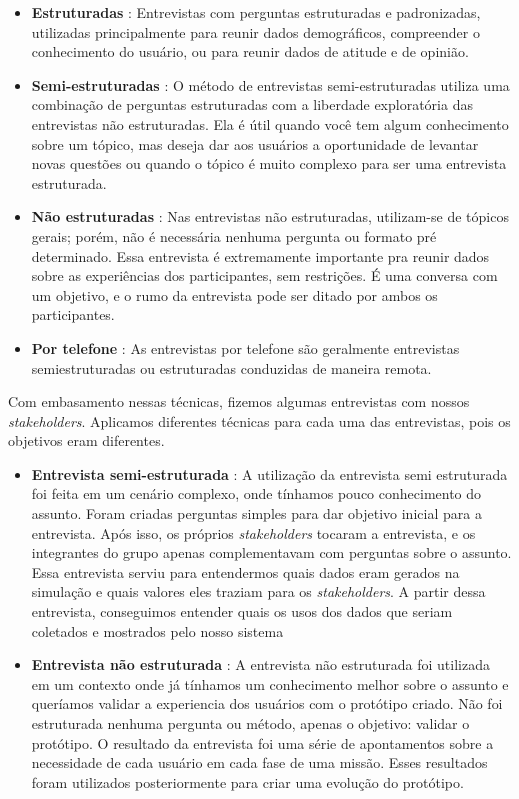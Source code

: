 \begin{itemize}
\item \textbf{Estruturadas} : Entrevistas com perguntas estruturadas e padronizadas, utilizadas principalmente para reunir dados demográficos, compreender o conhecimento do usuário, ou para reunir dados de atitude e de opinião.
\item \textbf{Semi-estruturadas} : O método de entrevistas semi-estruturadas utiliza uma combinação de perguntas estruturadas com a liberdade exploratória das entrevistas não estruturadas.
Ela é útil quando você tem algum conhecimento sobre um tópico, mas deseja dar aos usuários a oportunidade de levantar novas questões ou quando o tópico é muito complexo para ser uma entrevista estruturada.
\item \textbf{Não estruturadas} : Nas entrevistas não estruturadas, utilizam-se de tópicos gerais; porém, não é necessária nenhuma pergunta ou formato pré determinado. Essa entrevista é extremamente importante pra reunir dados sobre as experiências dos participantes, sem restrições. É uma conversa com um objetivo, e o rumo da entrevista pode ser ditado por ambos os participantes.
\item \textbf{Por telefone} : As entrevistas por telefone são geralmente entrevistas semiestruturadas ou estruturadas conduzidas de maneira remota.
\end{itemize}

Com embasamento nessas técnicas, fizemos algumas entrevistas com nossos \textit{stakeholders}. Aplicamos diferentes técnicas para cada uma das entrevistas, pois os objetivos eram diferentes.
\begin{itemize}
\item \textbf{Entrevista semi-estruturada} : A utilização da entrevista semi estruturada foi feita em um cenário complexo, onde tínhamos pouco conhecimento do assunto.
Foram criadas perguntas simples para dar objetivo inicial para a entrevista. Após isso, os próprios \textit{stakeholders} tocaram a entrevista, e os integrantes do grupo apenas complementavam com perguntas sobre o assunto. 
Essa entrevista serviu para entendermos quais dados eram gerados na simulação e quais valores eles traziam para os \textit{stakeholders}. A partir dessa entrevista, conseguimos entender quais os usos dos dados que seriam coletados e mostrados pelo nosso sistema
\item \textbf{Entrevista não estruturada} : A entrevista não estruturada foi utilizada em um contexto onde já tínhamos um conhecimento melhor sobre o assunto e queríamos validar a experiencia dos usuários com o protótipo criado.
Não foi estruturada nenhuma pergunta ou método, apenas o objetivo: validar o protótipo.
O resultado da entrevista foi uma série de apontamentos sobre a necessidade de cada usuário em cada fase de uma missão. Esses resultados foram utilizados posteriormente para criar uma evolução do protótipo.
\end{itemize}


